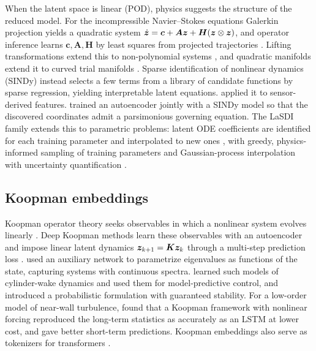 When the latent space is linear (POD), physics suggests the structure of the
reduced model. For the incompressible Navier--Stokes equations Galerkin
projection yields a quadratic system
$\dot{\bm{z}}=\bm{c}+\bm{A}\bm{z}+\bm{H}(\bm{z}\otimes\bm{z})$, and operator inference learns
$\bm{c},\bm{A},\bm{H}$ by least squares from projected trajectories
\parencite{peherstorfer2016opinf,kramer2024opinf}. Lifting transformations
extend this to non-polynomial systems \parencite{qian2020liftlearn}, and
quadratic manifolds extend it to curved trial manifolds
\parencite{geelen2023quadratic}. Sparse identification of nonlinear dynamics
(SINDy) \parencite{brunton2016sindy} instead selects a few terms from a library
of candidate functions by sparse regression, yielding interpretable latent
equations. \textcite{loiseau2018sparse} applied it to sensor-derived features.
\textcite{champion2019sindyae} trained an autoencoder jointly with a SINDy model
so that the discovered coordinates admit a parsimonious governing equation.
The LaSDI family extends this to parametric problems: latent ODE coefficients
are identified for each training parameter and interpolated to new ones
\parencite{fries2022lasdi}, with greedy, physics-informed sampling of training
parameters \parencite{he2023glasdi} and Gaussian-process interpolation with
uncertainty quantification \parencite{bonneville2024gplasdi}.

\subsection{Koopman embeddings}
\label{sec:koopman}

Koopman operator theory seeks observables in which a nonlinear system evolves
linearly \parencite{mezic2013,brunton2022koopman}. Deep Koopman methods learn
these observables with an autoencoder and impose linear latent dynamics
$\bm{z}_{k+1}=\bm{K}\bm{z}_k$ through a multi-step prediction loss
\parencite{takeishi2017koopman,lusch2018koopman,otto2019linearly}.
\textcite{lusch2018koopman} used an auxiliary network to parametrize eigenvalues
as functions of the state, capturing systems with continuous spectra.
\textcite{morton2018deep} learned such models of cylinder-wake dynamics and
used them for model-predictive control, and \textcite{pan2020physics}
introduced a probabilistic formulation with guaranteed stability. For a
low-order model of near-wall turbulence, \textcite{eivazi2021koopman} found that
a Koopman framework with nonlinear forcing reproduced the long-term statistics
as accurately as an LSTM at lower cost, and gave better short-term
predictions. Koopman embeddings also serve as tokenizers for transformers
\parencite{geneva2022transformers}.


